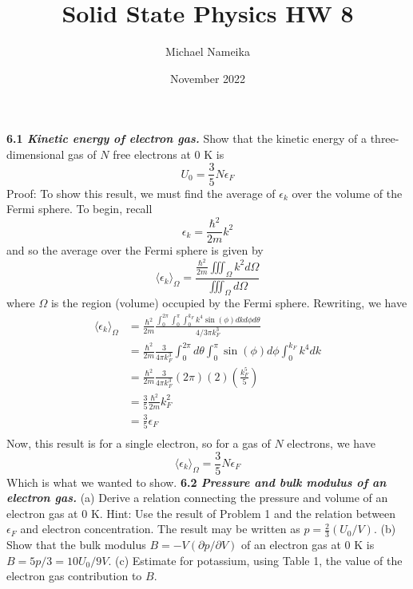 \documentclass{article}
\title{Solid State Physics HW 8}
\author{Michael Nameika}
\date{November 2022}
\begin{document}
\maketitle

\textbf{6.1 \textit{Kinetic energy of electron gas. }}Show that the kinetic energy of a three-dimensional gas of $N$ free electrons at $0$ K is
\[U_0 = \frac{3}{5}N\epsilon_F\]
Proof: To show this result, we must find the average of $\epsilon_k$ over the volume of the Fermi sphere. To begin, recall
\[\epsilon_k = \frac{\hbar^2}{2m}k^2\]
and so the average over the Fermi sphere is given by
\[\langle \epsilon_k \rangle_{\Omega} = \frac{\frac{\hbar^2}{2m}\iiint_{\Omega}k^2d\Omega}{\iiint_{\Omega}d\Omega}\]
where $\Omega$ is the region (volume) occupied by the Fermi sphere. Rewriting, we have
\begin{align*}
    \langle \epsilon_k \rangle_{\Omega} &= \frac{\hbar^2}{2m}\frac{\int_0^{2\pi}\int_0^{\pi}\int_0^{k_F}k^4\sin{(\phi)}dkd\phi d\theta}{4/3\pi k_F^3} \\
    &= \frac{\hbar^2}{2m}\frac{3}{4\pi k_F^3}\int_0^{2\pi}d\theta\int_0^{\pi}\sin{(\phi)}d\phi\int_0^{k_F}k^4dk \\
    &= \frac{\hbar^2}{2m}\frac{3}{4\pi k_F^3}(2\pi)(2)\left(\frac{k_F^5}{5}\right) \\
    &= \frac{3}{5}\frac{\hbar^2}{2m}k_F^2 \\
    &= \frac{3}{5}\epsilon_F \\
\end{align*}
Now, this result is for a single electron, so for a gas of $N$ electrons, we have
\[\langle \epsilon_k \rangle_{\Omega} = \frac{3}{5}N\epsilon_F\]
Which is what we wanted to show.
\newline\newline
\textbf{6.2 \textit{Pressure and bulk modulus of an electron gas.}} (a) Derive a relation connecting the pressure and volume of an electron gas at $0$ K. Hint: Use the result of Problem 1 and the relation between $\epsilon_F$ and electron concentration. The result may be written as $p = \frac{2}{3}(U_0/V)$. (b) Show that the bulk modulus $B = -V(\partial p/\partial V)$ of an electron gas at $0$ K is $B = 5p/3 = 10U_0/9V$. (c) Estimate for potassium, using Table 1, the value of the electron gas contribution to $B$.
\end{document}
